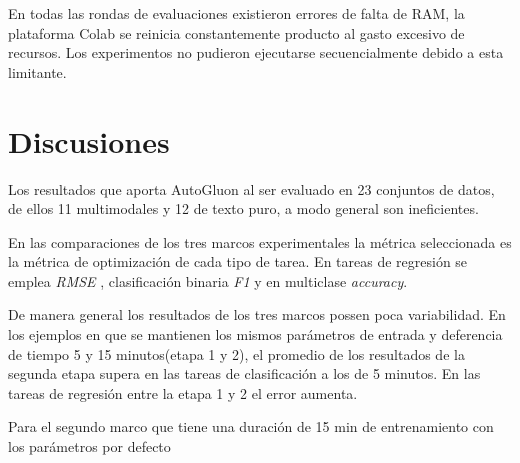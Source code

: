 En todas las rondas de evaluaciones existieron errores de falta de RAM, la plataforma Colab se reinicia constantemente producto al gasto excesivo de recursos. Los 
experimentos no pudieron ejecutarse secuencialmente debido a esta limitante.


\section{Discusiones}\label{subsection:discussions}


Los resultados que aporta AutoGluon al ser evaluado en 23 conjuntos de datos, de ellos 11 multimodales y 12 de texto puro, a modo general son ineficientes.

En las comparaciones de los tres marcos experimentales la métrica seleccionada es la métrica de optimización de cada tipo de tarea. En tareas de regresión 
se emplea \textit{RMSE} , clasificación binaria \textit{F1} y en multiclase \textit{accuracy}.

De manera general los resultados de los tres marcos possen poca variabilidad. En los ejemplos en que se mantienen los mismos parámetros de entrada y deferencia de 
tiempo 5 y 15 minutos(etapa 1 y 2), el promedio de los resultados de la segunda etapa supera en las tareas de clasificación a los de 5 minutos. En las tareas de 
regresión  entre la etapa 1 y 2 el error aumenta.



Para el segundo marco que tiene una duración de 15 min de entrenamiento con los parámetros por defecto 




